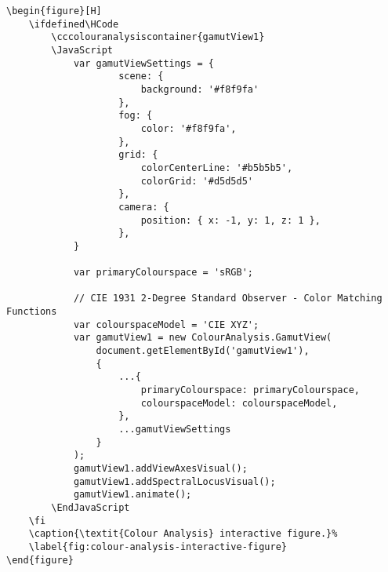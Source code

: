 \begin{lstlisting}[caption={\textit{Colour Analysis} interactive figure.}]
\begin{figure}[H]
    \ifdefined\HCode
        \cccolouranalysiscontainer{gamutView1}
        \JavaScript
            var gamutViewSettings = {
                    scene: {
                        background: '#f8f9fa'
                    },
                    fog: {
                        color: '#f8f9fa',
                    },
                    grid: {
                        colorCenterLine: '#b5b5b5',
                        colorGrid: '#d5d5d5'
                    },
                    camera: {
                        position: { x: -1, y: 1, z: 1 },
                    },
            }

            var primaryColourspace = 'sRGB';

            // CIE 1931 2-Degree Standard Observer - Color Matching Functions
            var colourspaceModel = 'CIE XYZ';
            var gamutView1 = new ColourAnalysis.GamutView(
                document.getElementById('gamutView1'),
                {
                    ...{
                        primaryColourspace: primaryColourspace,
                        colourspaceModel: colourspaceModel,
                    },
                    ...gamutViewSettings
                }
            );
            gamutView1.addViewAxesVisual();
            gamutView1.addSpectralLocusVisual();
            gamutView1.animate();
        \EndJavaScript
    \fi
    \caption{\textit{Colour Analysis} interactive figure.}%
    \label{fig:colour-analysis-interactive-figure}
\end{figure}
\end{lstlisting}

